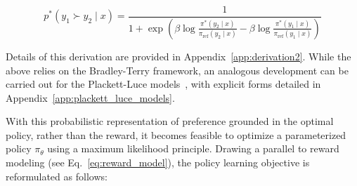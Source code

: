\begin{equation}\label{eq:objective}
    p^*(y_1\succ y_2 \mid x) = \frac{1}{1 + \exp\left(\beta \log \frac{\pi^*(y_2\mid x)}{\pi_\text{ref}(y_2\mid x)} - \beta \log \frac{\pi^*(y_1\mid x)}{\pi_\text{ref}(y_1\mid x)}\right)}
\end{equation}

Details of this derivation are provided in Appendix~\ref{app:derivation2}. While the above relies on the Bradley-Terry framework, an analogous development can be carried out for the Plackett-Luce models~\citep{plackett1975analysis, luce2012individual}, with explicit forms detailed in Appendix~\ref{app:plackett_luce_models}.

With this probabilistic representation of preference grounded in the optimal policy, rather than the reward, it becomes feasible to optimize a parameterized policy $\pi_\theta$ using a maximum likelihood principle. Drawing a parallel to reward modeling (see Eq.~\ref{eq:reward_model}), the policy learning objective is reformulated as follows:

